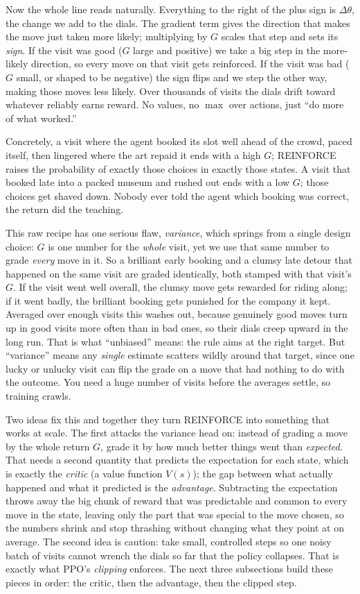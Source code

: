 \documentclass[11pt]{article}
\newcommand{\key}[1]{\textit{#1}}            %
\begin{document}
Now the whole line reads naturally. Everything to the right of the plus sign is
$\Delta\theta$, the change we add to the dials. The gradient term gives the direction that
makes the move just taken more likely; multiplying by $G$ scales that step and sets its
\emph{sign}. If the
visit was good ($G$ large and positive) we take a big step in the more-likely direction, so
every move on that visit gets reinforced. If the visit was bad ($G$ small, or shaped to be
negative) the sign flips and we step the other way, making those moves less likely. Over
thousands of visits the dials drift toward whatever reliably earns reward. No values, no
$\max$ over actions, just ``do more of what worked.''

Concretely, a visit where the agent booked its slot well ahead of the crowd, paced itself,
then lingered where the art repaid it ends with a high $G$; REINFORCE raises the probability
of exactly those choices in exactly those states. A visit that booked late into a packed
museum and rushed out ends with a low $G$; those choices get shaved down. Nobody ever told
the agent which booking was correct, the return did the teaching.

This raw recipe has one serious flaw, \key{variance}, which springs from a single design
choice: $G$ is one number for the \emph{whole} visit, yet we use that same number to grade
\emph{every} move in it. So a brilliant early booking and a clumsy late detour that happened
on the same visit are graded identically, both stamped with that visit's $G$. If the visit
went well overall, the clumsy move gets rewarded for riding along; if it went badly, the
brilliant booking gets punished for the company it kept. Averaged over enough visits this
washes out, because genuinely good moves turn up in good visits more often than in bad ones,
so their dials creep upward in the long run. That is what ``unbiased'' means: the rule aims
at the right target. But ``variance'' means any \emph{single} estimate scatters wildly around
that target, since one lucky or unlucky visit can flip the grade on a move that had nothing
to do with the outcome. You need a huge number of visits before the averages settle, so
training crawls.

Two ideas fix this and together they turn REINFORCE into something that works at scale. The
first attacks the variance head on: instead of grading a move by the whole return $G$, grade
it by how much better things went than \emph{expected}. That needs a second quantity that
predicts the expectation for each state, which is exactly the \key{critic} (a value function
$V(s)$); the gap between what actually happened and what it predicted is the \key{advantage}.
Subtracting the expectation throws away the big chunk of reward that was predictable and
common to every move in the state, leaving only the part that was special to the move chosen,
so the numbers shrink and stop thrashing without changing what they point at on average. The
second idea is caution: take small, controlled steps so one noisy batch of visits cannot
wrench the dials so far that the policy collapses. That is exactly what PPO's \key{clipping}
enforces. The next three subsections build these pieces in order: the critic, then the
advantage, then the clipped step.
\end{document}
